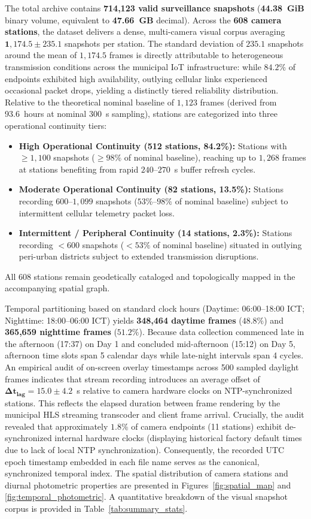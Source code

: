 \documentclass[preprint,12pt]{elsarticle}
\begin{document}
The total archive contains \textbf{714,123 valid surveillance snapshots} (\textbf{44.38~GiB} binary volume, equivalent to \textbf{47.66~GB} decimal). Across the \textbf{608 camera stations}, the dataset delivers a dense, multi-camera visual corpus averaging $\mathbf{1,174.5 \pm 235.1}$ snapshots per station. The standard deviation of $235.1$ snapshots around the mean of $1,174.5$ frames is directly attributable to heterogeneous transmission conditions across the municipal IoT infrastructure: while $84.2\%$ of endpoints exhibited high availability, outlying cellular links experienced occasional packet drops, yielding a distinctly tiered reliability distribution. Relative to the theoretical nominal baseline of $1,123$ frames (derived from 93.6~hours at nominal $300$~s sampling), stations are categorized into three operational continuity tiers:
\begin{itemize}
    \item \textbf{High Operational Continuity (512 stations, 84.2\%):} Stations with $\ge 1,100$ snapshots ($\ge 98\%$ of nominal baseline), reaching up to $1,268$ frames at stations benefiting from rapid $240$--$270$~s buffer refresh cycles.
    \item \textbf{Moderate Operational Continuity (82 stations, 13.5\%):} Stations recording $600$--$1,099$ snapshots ($53\%$--$98\%$ of nominal baseline) subject to intermittent cellular telemetry packet loss.
    \item \textbf{Intermittent / Peripheral Continuity (14 stations, 2.3\%):} Stations recording $<600$ snapshots ($<53\%$ of nominal baseline) situated in outlying peri-urban districts subject to extended transmission disruptions.
\end{itemize}
All 608 stations remain geodetically cataloged and topologically mapped in the accompanying spatial graph.

Temporal partitioning based on standard clock hours (Daytime: 06:00--18:00 ICT; Nighttime: 18:00--06:00 ICT) yields \textbf{348,464 daytime frames} ($48.8\%$) and \textbf{365,659 nighttime frames} ($51.2\%$). Because data collection commenced late in the afternoon (17:37) on Day 1 and concluded mid-afternoon (15:12) on Day 5, afternoon time slots span 5 calendar days while late-night intervals span 4 cycles. An empirical audit of on-screen overlay timestamps across 500 sampled daylight frames indicates that stream recording introduces an average offset of $\mathbf{\Delta t_{\text{lag}} = 15.0 \pm 4.2}$~s relative to camera hardware clocks on NTP-synchronized stations. This reflects the elapsed duration between frame rendering by the municipal HLS streaming transcoder and client frame arrival. Crucially, the audit revealed that approximately $1.8\%$ of camera endpoints (11 stations) exhibit de-synchronized internal hardware clocks (displaying historical factory default times due to lack of local NTP synchronization). Consequently, the recorded UTC epoch timestamp embedded in each file name serves as the canonical, synchronized temporal index. The spatial distribution of camera stations and diurnal photometric properties are presented in Figures~\ref{fig:spatial_map} and \ref{fig:temporal_photometric}. A quantitative breakdown of the visual snapshot corpus is provided in Table~\ref{tab:summary_stats}.
\end{document}

